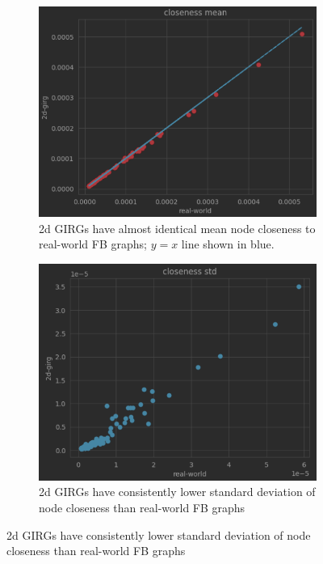 \begin{figure}
    \centering
    \begin{subfigure}{0.45\textwidth}
    \includegraphics[width=\linewidth]{./figures/real_2d_closeness_mean_scatter.png}
    \caption{2d GIRGs have almost identical mean node closeness to real-world FB graphs; $y=x$ line shown in blue.}
    \label{fig:real_2d_closeness_mean_scatter}
    \end{subfigure}
    \begin{subfigure}{0.45\textwidth}
    \includegraphics[width= \linewidth]{./figures/real_2d_closeness_std_scatter.png}
    \caption{2d GIRGs have consistently lower standard deviation of node closeness than real-world FB graphs}
    \end{subfigure}


\end{figure}
